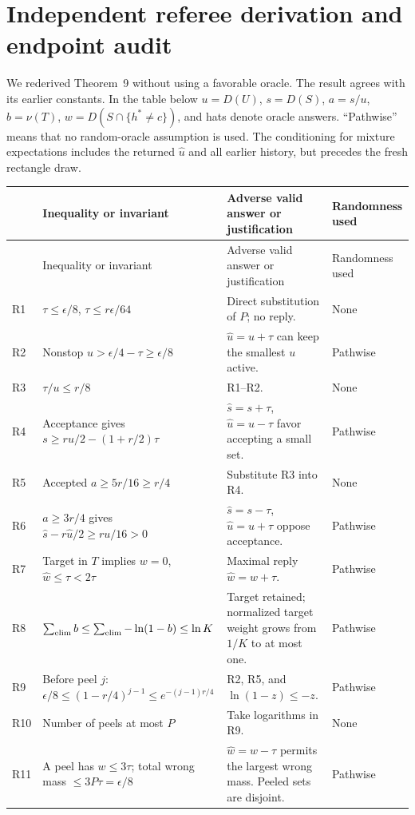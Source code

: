 \section{Independent referee derivation and endpoint audit}\label{app:referee}
We rederived Theorem~9 without using a favorable oracle. The result agrees with its earlier constants. In the table below $u=D(U)$, $s=D(S)$, $a=s/u$, $b=\nu(T)$, $w=D(S\cap\{h^*\ne c\})$, and hats denote oracle answers. ``Pathwise'' means that no random-oracle assumption is used. The conditioning for mixture expectations includes the returned $\widehat u$ and all earlier history, but precedes the fresh rectangle draw.

\small
\begin{longtable}{@{}p{.6cm}p{6.2cm}p{4.9cm}>{\raggedright\arraybackslash}p{2.4cm}@{}}
\toprule
& Inequality or invariant & Adverse valid answer or justification & Randomness used\\
\midrule\endfirsthead
\toprule & Inequality or invariant & Adverse valid answer or justification & Randomness used\\\midrule\endhead
R1 & $\tau\le\epsilon/8$, $\tau\le r\epsilon/64$ & Direct substitution of $P$; no reply. & None\\
R2 & Nonstop $u>\epsilon/4-\tau\ge\epsilon/8$ & $\widehat u=u+\tau$ can keep the smallest $u$ active. & Pathwise\\
R3 & $\tau/u\le r/8$ & R1--R2. & None\\
R4 & Acceptance gives $s\ge ru/2-(1+r/2)\tau$ & $\widehat s=s+\tau$, $\widehat u=u-\tau$ favor accepting a small set. & Pathwise\\
R5 & Accepted $a\ge5r/16\ge r/4$ & Substitute R3 into R4. & None\\
R6 & $a\ge3r/4$ gives $\widehat s-r\widehat u/2\ge ru/16>0$ & $\widehat s=s-\tau$, $\widehat u=u+\tau$ oppose acceptance. & Pathwise\\
R7 & Target in $T$ implies $w=0$, $\widehat w\le\tau<2\tau$ & Maximal reply $\widehat w=w+\tau$. & Pathwise\\
R8 & $\sum_{\rm elim}b\le\sum_{\rm elim}-\ln(1-b)\le\ln K$ & Target retained; normalized target weight grows from $1/K$ to at most one. & Pathwise\\
R9 & Before peel $j$: $\epsilon/8\le(1-r/4)^{j-1}\le e^{-(j-1)r/4}$ & R2, R5, and $\ln(1-z)\le-z$. & Pathwise\\
R10 & Number of peels at most $P$ & Take logarithms in R9. & None\\
R11 & A peel has $w\le3\tau$; total wrong mass $\le3P\tau=\epsilon/8$ & $\widehat w=w-\tau$ permits the largest wrong mass. Peeled sets are disjoint. & Pathwise\\

\end{longtable}
